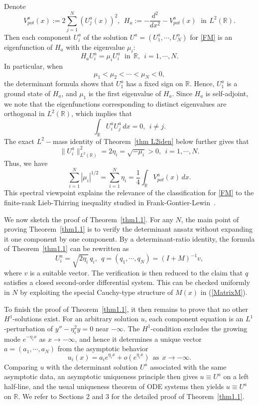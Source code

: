 \documentclass[11pt]{article}
\numberwithin{equation}{section}
\newcommand{\R}{{\mathbb{R}}}
\theoremstyle{definition}
\newtheorem{remark}{Remark}[section]
\begin{document}
Denote
\[
V_{pot}^a(x):=2\sum_{j=1}^N (U_j^a(x))^2,
\ \
H_a:=-\frac{d^2}{dx^2}-V_{pot}^a(x)\ \ \,\mbox{in} \, \ L^2(\R).
\]
Then each component \(U_i^a\) of the solution \(U^a=(U_1^a, \cdots, U_N^a)\) for \eqref{FM} is an eigenfunction of \(H_a\) with the
eigenvalue \(\mu_i\):
\[
H_aU_i^a=\mu_iU_i^a\ \,\ \mbox{in} \ \ \R,
\ \  i=1,\cdots,N .
\]
In particular, when
\[
\mu_1<\mu_2<\cdots<\mu_N<0,
\]
the determinant formula shows that \(U_1^a\) has a fixed sign on
\(\mathbb R\). Hence,   \(U_1^a\) is a ground state of \(H_a\), and \(\mu_1\) is the
first eigenvalue of \(H_a\).
Since \(H_a\) is self-adjoint, we note that the eigenfunctions corresponding to
distinct eigenvalues are orthogonal in \(L^2(\mathbb R)\), which implies that
\[
\int_{\mathbb R}U_i^aU_j^a\,dx=0,
\ \  i\neq j .
\]
The exact $L^2-$mass identity of Theorem~\ref{thm L2iden} below further gives that
\[
\|U_i^a\|_{L^2(\mathbb R)}^2=2\eta_i=\sqrt{-\mu_i}>0,
\ \  i=1,\cdots,N .
\]
Thus, we have
\[
\sum_{i=1}^N |\mu_i|^{1/2}
=
\sum_{i=1}^N \eta_i
=
\frac14\int_{\mathbb R}V_{pot}^a(x)\,dx .
\]
This spectral viewpoint explains the relevance of the classification for  \eqref{FM} to
the finite-rank Lieb-Thirring inequality studied in
Frank-Gontier-Lewin~\cite{Lewin}.




We now sketch  the proof of Theorem~\ref{thm1.1}.
For any \(N\), the main point of proving  Theorem~\ref{thm1.1} is to verify the determinant ansatz
without expanding it one component by one component.  By a determinant-ratio
identity, the formula of Theorem~\ref{thm1.1} can be rewritten as
\[
U_i^a=\sqrt{2\eta_i}\,q_i,
\ \  q=(q_1,\cdots,q_N)=(I+M)^{-1}v,
\]
where \(v\) is a suitable vector.  The verification is then reduced to the claim
that \(q\) satisfies a closed second-order differential system.  This can
be checked uniformly in \(N\) by exploiting the special Cauchy-type
structure of \(M(x)\) in (\ref{MatrixM}).


To finish the proof of Theorem~\ref{thm1.1}, it then remains to prove that no other \(H^1\)-solutions exist. For an arbitrary
solution \(u\), each component equation is an \(L^1\)-perturbation of
\(y''-\eta_i^2y=0\) near \(-\infty\). The \(H^1\)-condition excludes the
growing mode $e^{-\eta_ix}$ as $x\to-\infty$, and hence it determines a unique vector
\(a=(a_1,\cdots,a_N)\) from the asymptotic behavior
\[
u_i(x)=a_i e^{\eta_i x}+o(e^{\eta_i x})
\ \ \mbox{as}\ \  x\to-\infty .
\]
Comparing \(u\) with the determinant solution \(U^a\) associated with the
same asymptotic data, an asymptotic uniqueness principle then gives
\(u\equiv U^a\) on a left half-line, and the usual uniqueness theorem of
ODE systems then yields \(u\equiv U^a\) on \(\mathbb R\). We refer to Sections 2 and 3 for the detailed proof of   Theorem~\ref{thm1.1}.
\end{document}
